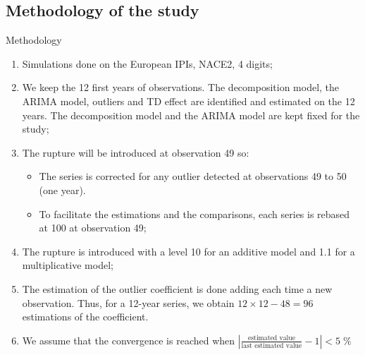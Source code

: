\documentclass[10pt, handout]{beamer}
\begin{document}
\subsection{Methodology of the study}
\begin{frame}{Methodology}

\begin{enumerate}
	\item Simulations done on the European IPIs, NACE2, 4 digits;
	\item We keep the 12 first years of observations. The decomposition model, the ARIMA model, outliers and TD effect are identified and estimated on the 12 years. The decomposition model and the ARIMA model are kept fixed for the study;
	\item<2-> The rupture will be introduced at observation 49 so:
	\begin{itemize}
	  \item<2-> The series is corrected for any outlier detected at observations 49 to 50 (one year).
	  \item<2-> To facilitate the estimations and the comparisons, each series is rebased at 100 at observation 49;
	\end{itemize}
	\item<3-> The rupture is introduced with a level 10 for an additive model and 1.1 for a multiplicative model;
	\item<3-> The estimation of the outlier coefficient is done adding each time a new observation. Thus, for a 12-year series, we obtain $12 \times 12 - 48 = 96$ estimations of the coefficient.
	\item<4-> We assume that the convergence is reached when $\left\lvert\frac{\text{estimated value}}{\text{last estimated value}}-1\right\rvert < 5\;\%$
\end{enumerate}
\end{frame}
\end{document}

